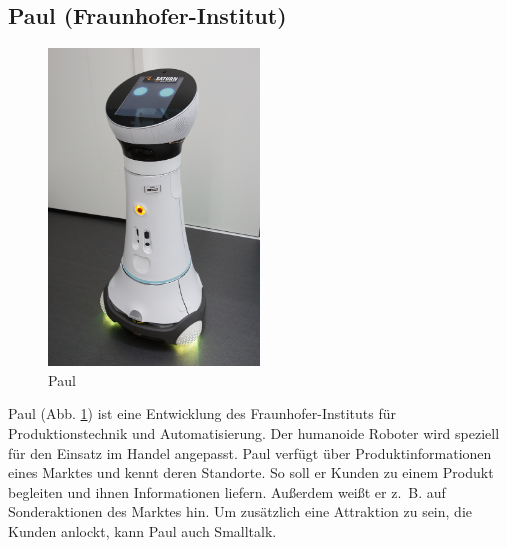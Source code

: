 \subsection{Paul (Fraunhofer-Institut)}
\begin{figure}
  \centering
     \includegraphics[width=0.5\textwidth]{paul}
  \caption{Paul \cite{AbbildungPaul}}
  \label{fig:paul}
\end{figure}
Paul (Abb. \ref{fig:paul}) ist eine Entwicklung des Fraunhofer-Instituts für
Produktionstechnik und Automatisierung. Der humanoide Roboter wird speziell für
den Einsatz im Handel angepasst. Paul verfügt über Produktinformationen eines
Marktes und kennt deren Standorte. So soll er Kunden zu einem Produkt begleiten
und ihnen Informationen liefern. Außerdem weißt er z.~B. auf Sonderaktionen des
Marktes hin. Um zusätzlich eine Attraktion zu sein, die Kunden anlockt, kann
Paul auch Smalltalk. \cite{MediaMarktSaturn2017}

